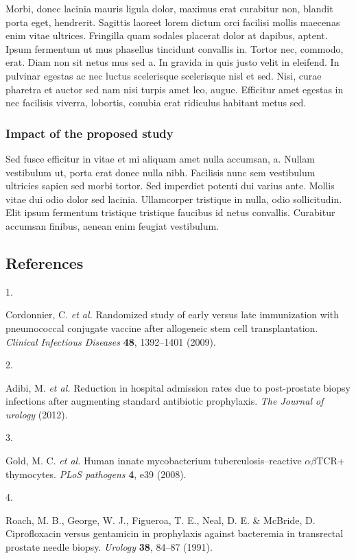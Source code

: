 \documentclass[
  11pt,
  letterpaper,
  DIV=11,
  numbers=noendperiod]{scrartcl}
\newlength{\cslhangindent}
\newlength{\csllabelwidth}
\newlength{\cslentryspacingunit} %
\newenvironment{CSLReferences}[2] %
 {%
  \setlength{\parindent}{0pt}
  \ifodd #1
  \let\oldpar\par
  \def\par{\hangindent=\cslhangindent\oldpar}
  \fi
  \setlength{\parskip}{#2\cslentryspacingunit}
 }%
 {}
\newcommand{\CSLLeftMargin}[1]{\parbox[t]{\csllabelwidth}{#1}}
\newcommand{\CSLRightInline}[1]{\parbox[t]{\linewidth - \csllabelwidth}{#1}\break}
\begin{document}
Morbi, donec lacinia mauris ligula dolor, maximus erat curabitur non,
blandit porta eget, hendrerit. Sagittis laoreet lorem dictum orci
facilisi mollis maecenas enim vitae ultrices. Fringilla quam sodales
placerat dolor at dapibus, aptent. Ipsum fermentum ut mus phasellus
tincidunt convallis in. Tortor nec, commodo, erat. Diam non sit netus
mus sed a. In gravida in quis justo velit in eleifend. In pulvinar
egestas ac nec luctus scelerisque scelerisque nisl et sed. Nisi, curae
pharetra et auctor sed nam nisi turpis amet leo, augue. Efficitur amet
egestas in nec facilisis viverra, lobortis, conubia erat ridiculus
habitant metus sed.

\hypertarget{impact-of-the-proposed-study}{%
\subsubsection{Impact of the proposed
study}\label{impact-of-the-proposed-study}}

Sed fusce efficitur in vitae et mi aliquam amet nulla accumsan, a.
Nullam vestibulum ut, porta erat donec nulla nibh. Facilisis nunc sem
vestibulum ultricies sapien sed morbi tortor. Sed imperdiet potenti dui
varius ante. Mollis vitae dui odio dolor sed lacinia. Ullamcorper
tristique in nulla, odio sollicitudin. Elit ipsum fermentum tristique
tristique faucibus id netus convallis. Curabitur accumsan finibus,
aenean enim feugiat vestibulum.

\newpage{}

\hypertarget{references}{%
\subsection*{References}\label{references}}

\hypertarget{refs}{}
\begin{CSLReferences}{0}{0}
\leavevmode{}%
\CSLLeftMargin{1. }%
\CSLRightInline{Cordonnier, C. \emph{et al.} Randomized study of early
versus late immunization with pneumococcal conjugate vaccine after
allogeneic stem cell transplantation. \emph{Clinical Infectious
Diseases} \textbf{48}, 1392--1401 (2009).}

\leavevmode{}%
\CSLLeftMargin{2. }%
\CSLRightInline{Adibi, M. \emph{et al.} Reduction in hospital admission
rates due to post-prostate biopsy infections after augmenting standard
antibiotic prophylaxis. \emph{The Journal of urology} (2012).}

\leavevmode{}%
\CSLLeftMargin{3. }%
\CSLRightInline{Gold, M. C. \emph{et al.} Human innate mycobacterium
tuberculosis--reactive \(\alpha\)\(\beta\)TCR+ thymocytes. \emph{PLoS
pathogens} \textbf{4}, e39 (2008).}

\leavevmode{}%
\CSLLeftMargin{4. }%
\CSLRightInline{Roach, M. B., George, W. J., Figueroa, T. E., Neal, D.
E. \& McBride, D. Ciprofloxacin versus gentamicin in prophylaxis against
bacteremia in transrectal prostate needle biopsy. \emph{Urology}
\textbf{38}, 84--87 (1991).}

\end{CSLReferences}
\end{document}
